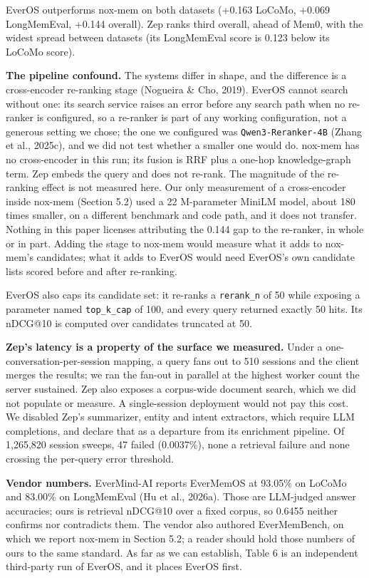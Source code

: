 \documentclass[a4paper,fleqn]{cas-sc}
\newcounter{none}  %
\begin{document}
EverOS outperforms nox-mem on both datasets (+0.163 LoCoMo, +0.069 LongMemEval, +0.144 overall). Zep ranks third overall, ahead of Mem0, with the widest spread between datasets (its LongMemEval score is 0.123 below its LoCoMo score).

\textbf{The pipeline confound.} The systems differ in shape, and the difference is a cross-encoder re-ranking stage (Nogueira \& Cho, 2019). EverOS cannot search without one: its search service raises an error before any search path when no re-ranker is configured, so a re-ranker is part of any working configuration, not a generous setting we chose; the one we configured was \texttt{Qwen3-Reranker-4B} (Zhang et al., 2025c), and we did not test whether a smaller one would do. nox-mem has no cross-encoder in this run; its fusion is RRF plus a one-hop knowledge-graph term. Zep embeds the query and does not re-rank. The magnitude of the re-ranking effect is not measured here. Our only measurement of a cross-encoder inside nox-mem (Section 5.2) used a 22 M-parameter MiniLM model, about 180 times smaller, on a different benchmark and code path, and it does not transfer. Nothing in this paper licenses attributing the 0.144 gap to the re-ranker, in whole or in part. Adding the stage to nox-mem would measure what it adds to nox-mem's candidates; what it adds to EverOS would need EverOS's own candidate lists scored before and after re-ranking.

EverOS also caps its candidate set: it re-ranks a \texttt{rerank\_n} of 50 while exposing a parameter named \texttt{top\_k\_cap} of 100, and every query returned exactly 50 hits. Its nDCG@10 is computed over candidates truncated at 50.

\textbf{Zep's latency is a property of the surface we measured.} Under a one-conversation-per-session mapping, a query fans out to 510 sessions and the client merges the results; we ran the fan-out in parallel at the highest worker count the server sustained. Zep also exposes a corpus-wide document search, which we did not populate or measure. A single-session deployment would not pay this cost. We disabled Zep's summarizer, entity and intent extractors, which require LLM completions, and declare that as a departure from its enrichment pipeline. Of 1,265,820 session sweeps, 47 failed (0.0037\%), none a retrieval failure and none crossing the per-query error threshold.

\textbf{Vendor numbers.} EverMind-AI reports EverMemOS at 93.05\% on LoCoMo and 83.00\% on LongMemEval (Hu et al., 2026a). Those are LLM-judged answer accuracies; ours is retrieval nDCG@10 over a fixed corpus, so 0.6455 neither confirms nor contradicts them. The vendor also authored EverMemBench, on which we report nox-mem in Section 5.2; a reader should hold those numbers of ours to the same standard. As far as we can establish, Table 6 is an independent third-party run of EverOS, and it places EverOS first.
\end{document}
